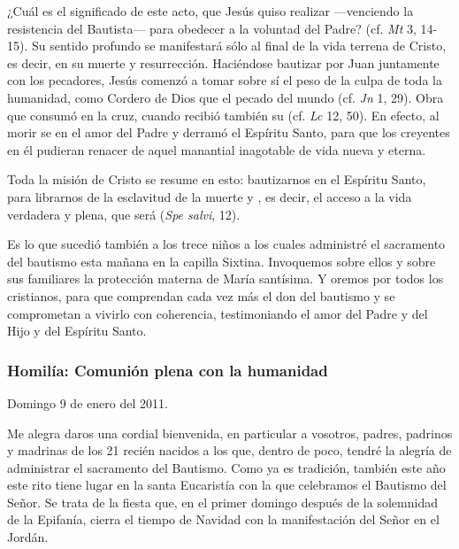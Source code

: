 \begin{body}
\begin{body}
{¿Cuál es el significado de este acto, que Jesús quiso realizar ---venciendo la resistencia del Bautista--- para obedecer a la voluntad del Padre? (cf. \emph{Mt} 3, 14-15). Su sentido profundo se manifestará sólo al final de la vida terrena de Cristo, es decir, en su muerte y resurrección. Haciéndose bautizar por Juan juntamente con los pecadores, Jesús comenzó a tomar sobre sí el peso de la culpa de toda la humanidad, como Cordero de Dios que  el pecado del mundo (cf. \emph{Jn} 1, 29). Obra que consumó en la cruz, cuando recibió también su  (cf. \emph{Lc} 12, 50). En efecto, al morir se  en el amor del Padre y derramó el Espíritu Santo, para que los creyentes en él pudieran renacer de aquel manantial inagotable de vida nueva y eterna.

Toda la misión de Cristo se resume en esto: bautizarnos en el Espíritu Santo, para librarnos de la esclavitud de la muerte y , es decir, el acceso a la vida verdadera y plena, que será  (\emph{Spe salvi}, 12).

Es lo que sucedió también a los trece niños a los cuales administré el sacramento del bautismo esta mañana en la capilla Sixtina. Invoquemos sobre ellos y sobre sus familiares la protección materna de María santísima. Y oremos por todos los cristianos, para que comprendan cada vez más el don del bautismo y se comprometan a vivirlo con coherencia, testimoniando el amor del Padre y del Hijo y del Espíritu Santo.

\subsubsection{Homilía: Comunión plena con la humanidad}

Domingo 9 de enero del 2011.

Me alegra daros una cordial bienvenida, en particular a vosotros, padres, padrinos y madrinas de los 21 recién nacidos a los que, dentro de poco, tendré la alegría de administrar el sacramento del Bautismo. Como ya es tradición, también este año este rito tiene lugar en la santa Eucaristía con la que celebramos el Bautismo del Señor. Se trata de la fiesta que, en el primer domingo después de la solemnidad de la Epifanía, cierra el tiempo de Navidad con la manifestación del Señor en el Jordán.

}
\end{body}
\end{body}
